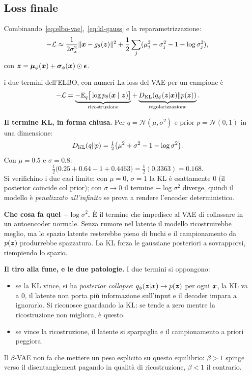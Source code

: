 \subsection{Loss finale}
Combinando~\eqref{eq:elbo-vae},~\eqref{eq:kl-gauss} e la reparametrizzazione:
\[
-\mathcal{L} \approx \frac{1}{2\sigma_x^2}\| \bm{x} - g_\theta(\bm{z}) \|^2 + \frac{1}{2}\sum_j (\mu_j^2 + \sigma_j^2 - 1 - \log \sigma_j^2),
\]
con $\bm{z} = \boldsymbol{\mu}_\phi(\bm{x}) + \boldsymbol{\sigma}_\phi(\bm{x}) \odot \boldsymbol{\epsilon}$.

\begin{esempiosvolto}{i due termini dell'ELBO, con numeri}
La loss del VAE per un campione è
\[
-\mathcal{L} = \underbrace{-\mathbb{E}_{q}\big[\log p_\theta(\bm{x} \mid \bm{z})\big]}_{\text{ricostruzione}} + \underbrace{D_{\mathrm{KL}}\!\left(q_\phi(\bm{z}|\bm{x}) \| p(\bm{z})\right)}_{\text{regolarizzazione}}.
\]

\medskip
\textbf{Il termine KL, in forma chiusa.} Per $q = \mathcal{N}(\mu, \sigma^2)$ e prior $p = \mathcal{N}(0,1)$ in una dimensione:
\[
D_{\mathrm{KL}}\!\left(q \| p\right) = \tfrac{1}{2}\big(\mu^2 + \sigma^2 - 1 - \log \sigma^2\big).
\]
Con $\mu = 0.5$ e $\sigma = 0.8$:
\[
\tfrac{1}{2}\big(0.25 + 0.64 - 1 + 0.4463\big) = \tfrac{1}{2}(0.3363) = \mathbf{0.168}.
\]
Si verifichino i due casi limite: con $\mu = 0$, $\sigma = 1$ la KL è esattamente $0$ (il posterior coincide col prior); con $\sigma \to 0$ il termine $-\log \sigma^2$ diverge, quindi il modello è \emph{penalizzato all'infinito} se prova a rendere l'encoder deterministico.

\medskip
\textbf{Che cosa fa quel $-\log \sigma^2$.} È il termine che impedisce al VAE di collassare in un autoencoder normale. Senza rumore nel latente il modello ricostruirebbe meglio, ma lo spazio latente resterebbe pieno di buchi e il campionamento da $p(\bm{z})$ produrrebbe spazzatura. La KL forza le gaussiane posteriori a sovrapporsi, riempiendo lo spazio.

\medskip
\textbf{Il tiro alla fune, e le due patologie.} I due termini si oppongono:
\begin{itemize}[leftmargin=1.4em]
  \item se la KL vince, si ha \emph{posterior collapse}: $q_\phi(\bm{z}|\bm{x}) \to p(\bm{z})$ per ogni $\bm{x}$, la KL va a $0$, il latente non porta più informazione sull'input e il decoder impara a ignorarlo. Si riconosce guardando la KL: se tende a zero mentre la ricostruzione non migliora, è questo.
  \item se vince la ricostruzione, il latente si sparpaglia e il campionamento a priori peggiora.
\end{itemize}
Il $\beta$-VAE non fa che mettere un peso esplicito su questo equilibrio: $\beta > 1$ spinge verso il disentanglement pagando in qualità di ricostruzione, $\beta < 1$ il contrario.


\end{esempiosvolto}
